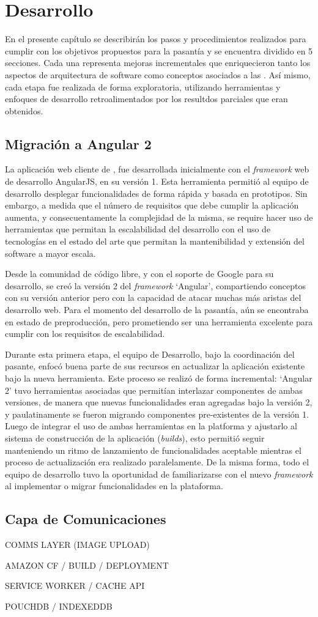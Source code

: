 \chapter{Desarrollo}

En el presente capítulo se describirán los pasos y procedimientos realizados para cumplir con los objetivos propuestos para la pasantía y se encuentra dividido en 5 secciones. Cada una representa mejoras incrementales que enriquecieron tanto los aspectos de arquitectura de software como conceptos asociados a las \pwas. Así mismo, cada etapa fue realizada de forma exploratoria, utilizando herramientas y enfoques de desarrollo retroalimentados por los resultdos parciales que eran obtenidos.

\section{Migración a Angular 2}

La aplicación web cliente de \business, fue desarrollada inicialmente con el \textit{framework} web de desarrollo AngularJS, en su versión 1. Esta herramienta permitió al equipo de desarrollo desplegar funcionalidades de forma rápida y basada en prototipos. Sin embargo, a medida que el número de requisitos que debe cumplir la aplicación aumenta, y consecuentamente la complejidad de la misma, se require hacer uso de herramientas que permitan la escalabilidad del desarrollo con el uso de tecnologías en el estado del arte que permitan la mantenibilidad y extensión del software a mayor escala.

Desde la comunidad de código libre, y con el soporte de Google para su desarrollo, se creó la versión 2 del \textit{framework} `Angular', compartiendo conceptos con su versión anterior pero con la capacidad de atacar muchas más aristas del desarrollo web. Para el momento del desarrollo de la pasantía, aún se encontraba en estado de preproducción, pero prometiendo ser una herramienta excelente para cumplir con los requisitos de escalabilidad.

Durante esta primera etapa, el equipo de Desarrollo, bajo la coordinación del pasante, enfocó buena parte de sus recursos en actualizar la aplicación existente bajo la nueva herramienta. Este proceso se realizó de forma incremental: `Angular 2' tuvo herramientas asociadas que permitían interlazar componentes de ambas versiones, de manera que nuevas funcionalidades eran agregadas bajo la versión 2, y paulatinamente se fueron migrando componentes pre-existentes de la versión 1. Luego de integrar el uso de ambas herramientas en la platforma y ajustarlo al sistema de construcción de la aplicación (\textit{builds}), esto permitió seguir manteniendo un ritmo de lanzamiento de funcionalidades aceptable mientras el proceso de actualización era realizado paralelamente. De la misma forma, todo el equipo de desarrollo tuvo la oportunidad de familiarizarse con el nuevo \textit{framework} al implementar o migrar funcionalidades en la plataforma.

\section{Capa de Comunicaciones}

COMMS LAYER (IMAGE UPLOAD)

AMAZON CF / BUILD / DEPLOYMENT

SERVICE WORKER / CACHE API

POUCHDB / INDEXEDDB
